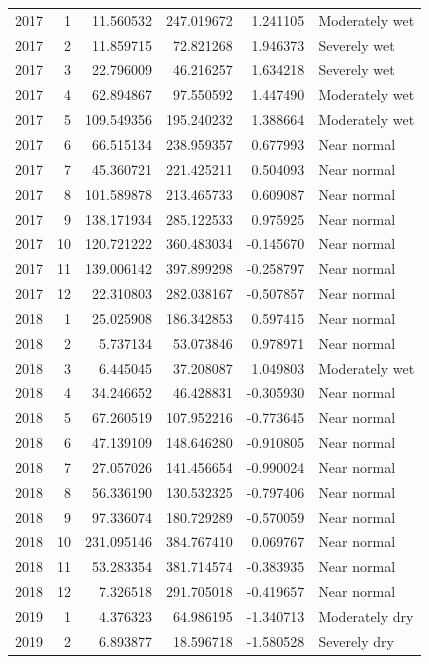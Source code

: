 \begin{tabular}{rrrrrl}
2017 & 1 & 11.560532 & 247.019672 & 1.241105 & Moderately wet \\
2017 & 2 & 11.859715 & 72.821268 & 1.946373 & Severely wet \\
2017 & 3 & 22.796009 & 46.216257 & 1.634218 & Severely wet \\
2017 & 4 & 62.894867 & 97.550592 & 1.447490 & Moderately wet \\
2017 & 5 & 109.549356 & 195.240232 & 1.388664 & Moderately wet \\
2017 & 6 & 66.515134 & 238.959357 & 0.677993 & Near normal \\
2017 & 7 & 45.360721 & 221.425211 & 0.504093 & Near normal \\
2017 & 8 & 101.589878 & 213.465733 & 0.609087 & Near normal \\
2017 & 9 & 138.171934 & 285.122533 & 0.975925 & Near normal \\
2017 & 10 & 120.721222 & 360.483034 & -0.145670 & Near normal \\
2017 & 11 & 139.006142 & 397.899298 & -0.258797 & Near normal \\
2017 & 12 & 22.310803 & 282.038167 & -0.507857 & Near normal \\
2018 & 1 & 25.025908 & 186.342853 & 0.597415 & Near normal \\
2018 & 2 & 5.737134 & 53.073846 & 0.978971 & Near normal \\
2018 & 3 & 6.445045 & 37.208087 & 1.049803 & Moderately wet \\
2018 & 4 & 34.246652 & 46.428831 & -0.305930 & Near normal \\
2018 & 5 & 67.260519 & 107.952216 & -0.773645 & Near normal \\
2018 & 6 & 47.139109 & 148.646280 & -0.910805 & Near normal \\
2018 & 7 & 27.057026 & 141.456654 & -0.990024 & Near normal \\
2018 & 8 & 56.336190 & 130.532325 & -0.797406 & Near normal \\
2018 & 9 & 97.336074 & 180.729289 & -0.570059 & Near normal \\
2018 & 10 & 231.095146 & 384.767410 & 0.069767 & Near normal \\
2018 & 11 & 53.283354 & 381.714574 & -0.383935 & Near normal \\
2018 & 12 & 7.326518 & 291.705018 & -0.419657 & Near normal \\
2019 & 1 & 4.376323 & 64.986195 & -1.340713 & Moderately dry \\
2019 & 2 & 6.893877 & 18.596718 & -1.580528 & Severely dry \\

\end{tabular}
